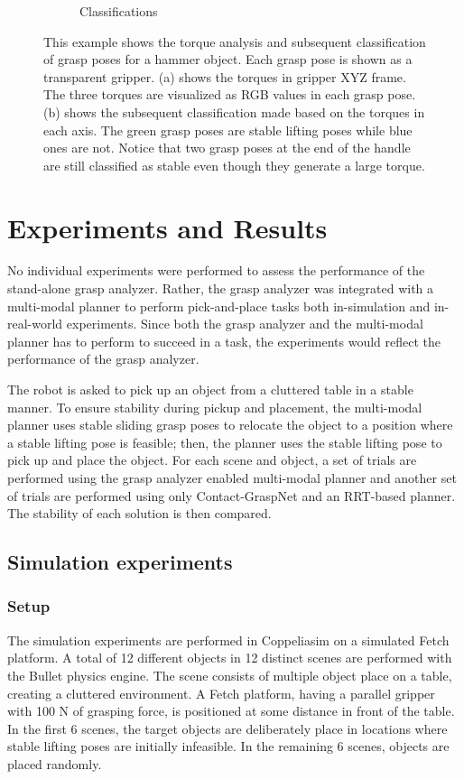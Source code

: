 \documentclass[12pt]{ucsddissertation}
\begin{document}
\begin{figure}
\begin{subfigure}[b]{0.4165\linewidth}
		\caption{Classifications}\label{classificationfigb}
	\end{subfigure}%
	\caption[Example of torques and the subsquent classifciations made for stable lifting grasp poses]{This example shows the torque analysis and subsequent classification of grasp poses for a hammer object. Each grasp pose is shown as a transparent gripper. (a) shows the torques in gripper XYZ frame. The three torques are visualized as RGB values in each grasp pose. (b) shows the subsequent classification made based on the torques in each axis. The green grasp poses are stable lifting poses while blue ones are not. Notice that two grasp poses at the end of the handle are still classified as stable even though they generate a large torque.}
	\label{fig:classificationExample}
\end{figure}


\chapter{Experiments and Results}
No individual experiments were performed to assess the performance of the stand-alone grasp analyzer. Rather, the grasp analyzer was integrated with a multi-modal planner \cite{iRos2023} to perform pick-and-place tasks both in-simulation and in-real-world experiments. Since both the grasp analyzer and the multi-modal planner has to perform to succeed in a task, the experiments would reflect the performance of the grasp analyzer. 

The robot is asked to pick up an object from a cluttered table in a stable manner. To ensure stability during pickup and placement, the multi-modal planner uses stable sliding grasp poses to relocate the object to a position where a stable lifting pose is feasible; then, the planner uses the stable lifting pose to pick up and place the object.  For each scene and object, a set of trials are performed using the grasp analyzer enabled multi-modal planner and another set of trials are performed using only Contact-GraspNet and an RRT-based planner. The stability of each solution is then compared.

\section{Simulation experiments}
\subsection{Setup}
The simulation experiments are performed in Coppeliasim \cite{coppeliasim} on a simulated Fetch platform. A total of 12 different objects in 12 distinct scenes are performed with the Bullet physics engine. The scene consists of multiple object place on a table, creating a cluttered environment. A Fetch platform, having a parallel gripper with 100 N of grasping force, is positioned at some distance in front of the table. In the first 6 scenes, the target objects are deliberately place in locations where stable lifting poses are initially infeasible. In the remaining 6 scenes, objects are placed randomly.
\end{document}
